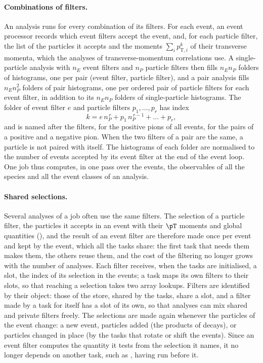 \paragraph{Combinations of filters.}
An analysis runs for every combination of its filters. For each event, an event processor records which event filters
accept the event, and, for each particle filter, the list of the particles it accepts and the moments
$\sum_i p_{\mathrm{T},i}^k$ of their transverse momenta, which the analyses of transverse-momentum correlations use.
A single-particle analysis with $n_E$ event filters and $n_P$ particle filters then fills $n_E n_P$ folders of
histograms, one per pair (event filter, particle filter), and a pair analysis fills $n_E n_P^2$ folders of pair
histograms, one per ordered pair of particle filters for each event filter, in addition to its $n_E n_P$ folders of
single-particle histograms. The folder of event filter $e$ and particle filters $p_1, \dots, p_r$ has index
\begin{equation}
  k = e\, n_P^{\,r} + p_1\, n_P^{\,r-1} + \dots + p_r ,
\end{equation}
and is named after the filters,  for the positive pions of all events,  for the pairs of a
positive and a negative pion. When the two filters of a pair are the same, a particle is not paired with itself. The
histograms of each folder are normalised to the number of events accepted by its event filter at the end of the event
loop. One job thus computes, in one pass over the events, the observables of all the species and all the event classes of
an analysis.

\paragraph{Shared selections.}
Several analyses of a job often use the same filters. The selection of a particle filter, the particles it accepts in
an event with their $\pT$ moments and global quantities (), and the result of an event filter
are therefore made once per event and kept by the event, which all the tasks share: the first task that needs them
makes them, the others reuse them, and the cost of the filtering no longer grows with the number of analyses. Each
filter receives, when the tasks are initialised, a slot, the index of its selection in the events; a task maps its own
filters to their slots, so that reaching a selection takes two array lookups. Filters are identified by their object:
those of the store, shared by the tasks, share a slot, and a filter made by a task for itself has a slot of its own, so
that analyses can mix shared and private filters freely. The selections are made again whenever the particles of the
event change: a new event, particles added (the products of decays), or particles changed in place (by the tasks that
rotate or shift the events). Since an event filter computes the quantity it tests from the selection it names, it no
longer depends on another task, such as , having run before it.

